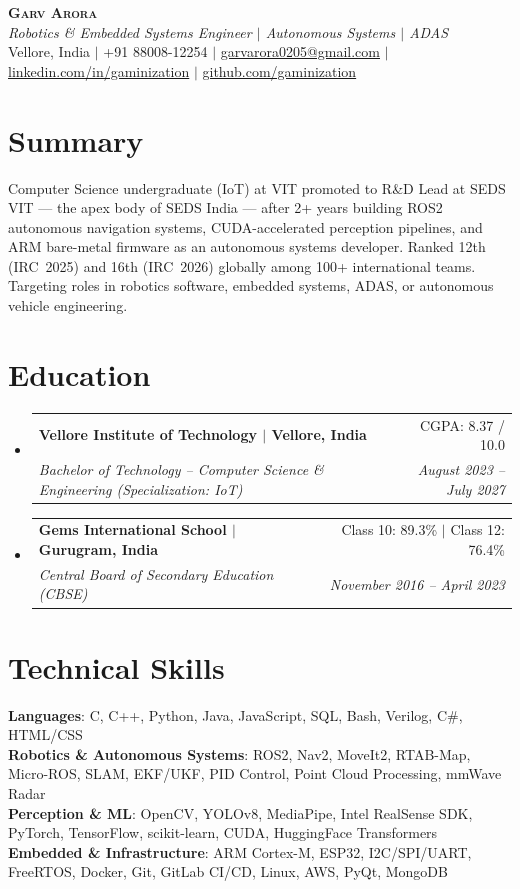 \documentclass[letterpaper,10pt]{article}
\makeatletter
\newcommand{\resumeSubheading}[4]{
  \vspace{-2pt}\item
    \begin{tabular*}{0.97\textwidth}[t]{l@{\extracolsep{\fill}}r}
      \textbf{#1} & #2 \\
      \textit{\small#3} & \textit{\small #4} \\
    \end{tabular*}\vspace{-7pt}
}
\newcommand{\resumeSubHeadingListStart}{\begin{itemize}[leftmargin=0.15in, label={}]}
\newcommand{\resumeSubHeadingListEnd}{\end{itemize}}
\makeatother
\begin{document}
\begin{center}
    \textbf{\Huge \scshape Garv Arora} \\ \vspace{2pt}
    \small \textit{Robotics \& Embedded Systems Engineer $|$ Autonomous Systems $|$ ADAS} \\ \vspace{2pt}
    \small Vellore, India $|$
    +91 88008-12254 $|$
    \href{mailto:garvarora0205@gmail.com}{garvarora0205@gmail.com} $|$
    \href{https://linkedin.com/in/gaminization}{linkedin.com/in/gaminization} $|$
    \href{https://github.com/gaminization}{github.com/gaminization}
\end{center}

\section{Summary}
\vspace{2pt}
\small{Computer Science undergraduate (IoT) at VIT promoted to R\&D Lead at SEDS VIT --- the apex body of SEDS India --- after 2+ years building ROS2 autonomous navigation systems, CUDA-accelerated perception pipelines, and ARM bare-metal firmware as an autonomous systems developer. Ranked 12th (IRC~2025) and 16th (IRC~2026) globally among 100+ international teams. Targeting roles in robotics software, embedded systems, ADAS, or autonomous vehicle engineering.}

\section{Education}
  \resumeSubHeadingListStart
    \resumeSubheading
      {Vellore Institute of Technology $|$ Vellore, India}{CGPA: 8.37 / 10.0}
      {Bachelor of Technology -- Computer Science \& Engineering (Specialization: IoT)}{August 2023 -- July 2027}
    \resumeSubheading
      {Gems International School $|$ Gurugram, India}{Class 10: 89.3\% $|$ Class 12: 76.4\%}
      {Central Board of Secondary Education (CBSE)}{November 2016 -- April 2023}
  \resumeSubHeadingListEnd

\section{Technical Skills}
\begin{itemize}[leftmargin=0.15in, label={}]
  \small{\item{
    \textbf{Languages}{: C, C++, Python, Java, JavaScript, SQL, Bash, Verilog, C\#, HTML/CSS} \\
    \textbf{Robotics \& Autonomous Systems}{: ROS2, Nav2, MoveIt2, RTAB-Map, Micro-ROS, SLAM, EKF/UKF, PID Control, Point Cloud Processing, mmWave Radar} \\
    \textbf{Perception \& ML}{: OpenCV, YOLOv8, MediaPipe, Intel RealSense SDK, PyTorch, TensorFlow, scikit-learn, CUDA, HuggingFace Transformers} \\
    \textbf{Embedded \& Infrastructure}{: ARM Cortex-M, ESP32, I2C/SPI/UART, FreeRTOS, Docker, Git, GitLab CI/CD, Linux, AWS, PyQt, MongoDB}
  }}
\end{itemize}
\end{document}

